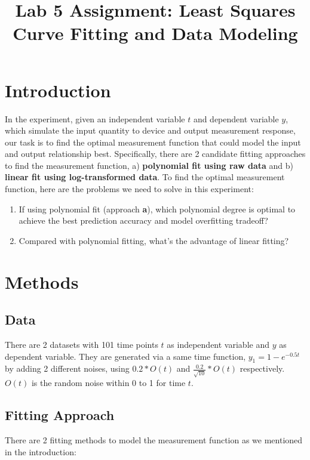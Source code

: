 \documentclass[11pt,a4paper,fleqn]{article}
\title{\vspace{-1cm}\Large{Lab 5 Assignment: Least Squares Curve Fitting and Data Modeling} \vspace{-1cm}}
\date{}
\author{}
\begin{document}
    \maketitle
    \section{Introduction}
    In the experiment, given an independent variable $t$ and dependent variable $y$, which simulate the input quantity to device and output measurement response, our task is to find the optimal measurement function that could model the input and output relationship best. Specifically, there are 2 candidate fitting approaches to find the measurement function, a) \textbf{polynomial fit using raw data} and b) \textbf{linear fit using log-transformed data}. To find the optimal measurement function, here are the problems we need to solve in this experiment:
    \begin{enumerate}
        \item If using polynomial fit (approach \textbf{a}), which polynomial degree is optimal to achieve the best prediction accuracy and model overfitting tradeoff?
        \item Compared with polynomial fitting, what's the advantage of linear fitting?
    \end{enumerate}

    \section{Methods}
    \subsection{Data}
    There are 2 datasets with 101 time points $t$ as independent variable and $y$ as dependent variable. They are generated via a same time function, $y_1=1-e^{-0.5t}$ by adding 2 different noises, using $0.2*O(t)$ and $\frac{0.2}{\sqrt{10}}*O(t)$ respectively. $O(t)$ is the random noise within 0 to 1 for time $t$. 

    \subsection{Fitting Approach}
    There are 2 fitting methods to model the measurement function as we mentioned in the introduction:
\end{document}

